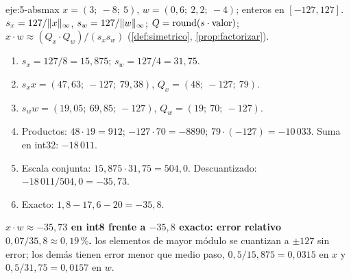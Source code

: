 \begin{solucion}{eje:5-absmax}
\datos $x=(3;\allowbreak\ -8;\allowbreak\ 5)$, $w=(0{,}6;\allowbreak\ 2{,}2;\allowbreak\ -4)$; enteros en $[-127,127]$.
\planteamiento $s_x=127/\lVert x\rVert_\infty$, $s_w=127/\lVert w\rVert_\infty$; $Q=\operatorname{round}(s\cdot\text{valor})$; $x\cdot w\approx(Q_x\cdot Q_w)/(s_xs_w)$ (\cref{def:simetrico}, \cref{prop:factorizar}).
\pasos
\begin{enumerate}[label=\arabic*.]
  \item $s_x=127/8=15{,}875$; $s_w=127/4=31{,}75$.
  \item $s_xx=(47{,}63;\allowbreak\ -127;\allowbreak\ 79{,}38)$, $Q_x=(48;\allowbreak\ -127;\allowbreak\ 79)$.
  \item $s_ww=(19{,}05;\allowbreak\ 69{,}85;\allowbreak\ -127)$, $Q_w=(19;\allowbreak\ 70;\allowbreak\ -127)$.
  \item Productos: $48\cdot 19=912$; $-127\cdot 70=-8890$; $79\cdot(-127)=-10\,033$. Suma en int32: $-18\,011$.
  \item Escala conjunta: $15{,}875\cdot 31{,}75=504{,}0$. Descuantizado: $-18\,011/504{,}0=-35{,}73$.
  \item Exacto: $1{,}8-17{,}6-20=-35{,}8$.
\end{enumerate}
\resultado \textbf{$x\cdot w\approx-35{,}73$ en int8 frente a $-35{,}8$ exacto: error relativo $0{,}07/35{,}8\approx 0{,}19\,\%$.}
\comprobacion los elementos de mayor módulo se cuantizan a $\pm 127$ sin error; los demás tienen error menor que medio paso, $0{,}5/15{,}875=0{,}0315$ en $x$ y $0{,}5/31{,}75=0{,}0157$ en $w$.
\end{solucion}

